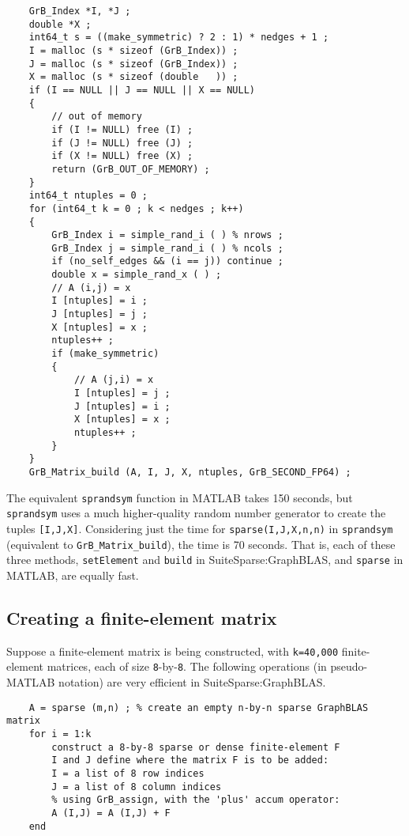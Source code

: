 \documentclass[12pt]{article}
\begin{document}
    {\footnotesize
    \begin{verbatim}
    GrB_Index *I, *J ;
    double *X ;
    int64_t s = ((make_symmetric) ? 2 : 1) * nedges + 1 ;
    I = malloc (s * sizeof (GrB_Index)) ;
    J = malloc (s * sizeof (GrB_Index)) ;
    X = malloc (s * sizeof (double   )) ;
    if (I == NULL || J == NULL || X == NULL)
    {
        // out of memory
        if (I != NULL) free (I) ;
        if (J != NULL) free (J) ;
        if (X != NULL) free (X) ;
        return (GrB_OUT_OF_MEMORY) ;
    }
    int64_t ntuples = 0 ;
    for (int64_t k = 0 ; k < nedges ; k++)
    {
        GrB_Index i = simple_rand_i ( ) % nrows ;
        GrB_Index j = simple_rand_i ( ) % ncols ;
        if (no_self_edges && (i == j)) continue ;
        double x = simple_rand_x ( ) ;
        // A (i,j) = x
        I [ntuples] = i ;
        J [ntuples] = j ;
        X [ntuples] = x ;
        ntuples++ ;
        if (make_symmetric)
        {
            // A (j,i) = x
            I [ntuples] = j ;
            J [ntuples] = i ;
            X [ntuples] = x ;
            ntuples++ ;
        }
    }
    GrB_Matrix_build (A, I, J, X, ntuples, GrB_SECOND_FP64) ; \end{verbatim}}

The equivalent \verb'sprandsym' function in MATLAB takes 150 seconds, but
\verb'sprandsym' uses a much higher-quality random number generator to create
the tuples \verb'[I,J,X]'.  Considering just the time for
\verb'sparse(I,J,X,n,n)' in \verb'sprandsym' (equivalent to
\verb'GrB_Matrix_build'), the time is 70 seconds.  That is, each of these three
methods, \verb'setElement' and \verb'build' in SuiteSparse:GraphBLAS, and
\verb'sparse' in MATLAB, are equally fast.

\subsection{Creating a finite-element matrix}
\label{fem}

Suppose a finite-element matrix is being constructed, with \verb'k=40,000'
finite-element matrices, each of size \verb'8'-by-\verb'8'.  The following
operations (in pseudo-MATLAB notation) are very efficient in
SuiteSparse:GraphBLAS.

    {\footnotesize
    \begin{verbatim}
    A = sparse (m,n) ; % create an empty n-by-n sparse GraphBLAS matrix
    for i = 1:k
        construct a 8-by-8 sparse or dense finite-element F
        I and J define where the matrix F is to be added:
        I = a list of 8 row indices
        J = a list of 8 column indices
        % using GrB_assign, with the 'plus' accum operator:
        A (I,J) = A (I,J) + F
    end \end{verbatim}}
\end{document}
